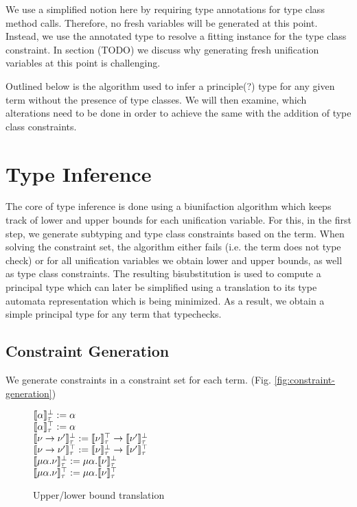 We use a simplified notion here by requiring type annotations for type class method calls.
Therefore, no fresh variables will be generated at this point.
Instead, we use the annotated type to resolve a fitting instance for the type class constraint.
In section (TODO) we discuss why generating fresh unification variables at this point is challenging.

Outlined below is the algorithm used to infer a principle(?) type for any given term without the presence of type classes.
We will then examine, which alterations need to be done in order to achieve the same with the addition of type class constraints.

\section{Type Inference}
\label{sec:type-inference}

The core of type inference is done using a biunifaction algorithm which keeps track of lower and upper bounds for each unification variable.
For this, in the first step, we generate subtyping and type class constraints based on the term.
When solving the constraint set, the algorithm either fails (i.e. the term does not type check) or for all unification variables we obtain lower and upper bounds, as well as type class constraints.
The resulting bisubstitution is used to compute a principal type which can later be simplified using a translation to its type automata representation which is being minimized.
As a result, we obtain a simple principal type for any term that typechecks.

\subsection{Constraint Generation}

We generate constraints in a constraint set for each term. (Fig. \ref{fig:constraint-generation})


\begin{figure}[h]
    \begin{center}
        $\llbracket \alpha \rrbracket_\tau^\bot := \alpha$ \\
        $\llbracket \alpha \rrbracket_\tau^\top := \alpha$ \\
        $\llbracket \nu \to \nu' \rrbracket_\tau^\bot := \llbracket \nu \rrbracket_\tau^\top \to \llbracket \nu' \rrbracket_\tau^\bot$ \\
        $\llbracket \nu \to \nu' \rrbracket_\tau^\top := \llbracket \nu \rrbracket_\tau^\bot \to \llbracket \nu' \rrbracket_\tau^\top$ \\
        $\llbracket \mu\alpha.\nu \rrbracket_\tau^\bot := \mu\alpha.\llbracket \nu \rrbracket_\tau^\bot$ \\
        $\llbracket \mu\alpha.\nu \rrbracket_\tau^\top := \mu\alpha.\llbracket \nu \rrbracket_\tau^\top$ \\
    \end{center}
    \caption{Upper/lower bound translation}
    \label{fig:bound-translation}
\end{figure}

